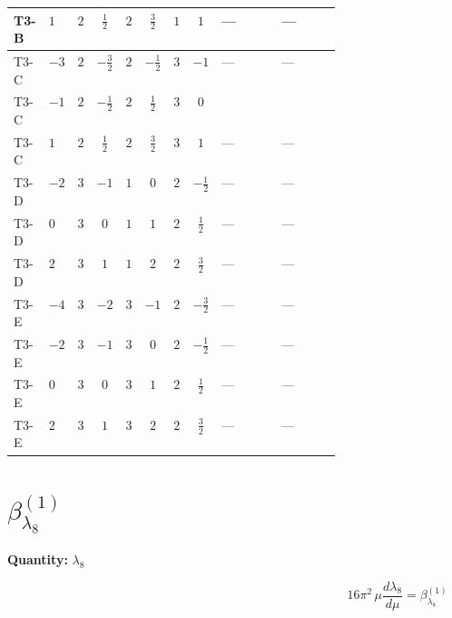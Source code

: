 \documentclass[8pt]{article}
\begin{document}
\begin{landscape}
\begin{longtable}{@{}llcccccc >{\raggedright\arraybackslash}p{0.21\linewidth} >{\raggedright\arraybackslash}p{0.21\linewidth}@{}}
\midrule
T3-B & $1$ & $2$ & $\frac{1}{2}$ & $2$ & $\frac{3}{2}$ & $1$ & $1$ & --- & --- \\
\midrule
T3-C & $-3$ & $2$ & $-\frac{3}{2}$ & $2$ & $-\frac{1}{2}$ & $3$ & $-1$ & --- & --- \\
\midrule
T3-C & $-1$ & $2$ & $-\frac{1}{2}$ & $2$ & $\frac{1}{2}$ & $3$ & $0$ & \scriptsize\adjustbox{max width=\linewidth}{$\begin{gathered} +{\lambda_{HS_2}^{(A)}} \left(-\frac{3 {\lambda_{H H^\dagger S_1^\dagger S_2^\dagger}^{\rm Cross}}}{2}-\frac{3 {\lambda_{10}}}{4}\right)\end{gathered}$} & \scriptsize\adjustbox{max width=\linewidth}{$\begin{gathered} {\lambda_{H H^\dagger S_1^\dagger S_2^\dagger}^{\rm Cross}} \left(\frac{3}{2} T_{\nu}^{(1)}+\frac{3}{2} T_{\nu}^{(2)}+6 \operatorname{Tr}\!\left({Y_d}\,\left({Y_d}\right)^{\dagger}\right)+2 \operatorname{Tr}\!\left({Y_e}\,\left({Y_e}\right)^{\dagger}\right)+6 \operatorname{Tr}\!\left({Y_u}\,\left({Y_u}\right)^{\dagger}\right)\right)\end{gathered}$} \\
\midrule
T3-C & $1$ & $2$ & $\frac{1}{2}$ & $2$ & $\frac{3}{2}$ & $3$ & $1$ & --- & --- \\
\midrule
T3-D & $-2$ & $3$ & $-1$ & $1$ & $0$ & $2$ & $-\frac{1}{2}$ & --- & --- \\
\midrule
T3-D & $0$ & $3$ & $0$ & $1$ & $1$ & $2$ & $\frac{1}{2}$ & --- & --- \\
\midrule
T3-D & $2$ & $3$ & $1$ & $1$ & $2$ & $2$ & $\frac{3}{2}$ & --- & --- \\
\midrule
T3-E & $-4$ & $3$ & $-2$ & $3$ & $-1$ & $2$ & $-\frac{3}{2}$ & --- & --- \\
\midrule
T3-E & $-2$ & $3$ & $-1$ & $3$ & $0$ & $2$ & $-\frac{1}{2}$ & --- & --- \\
\midrule
T3-E & $0$ & $3$ & $0$ & $3$ & $1$ & $2$ & $\frac{1}{2}$ & --- & --- \\
\midrule
T3-E & $2$ & $3$ & $1$ & $3$ & $2$ & $2$ & $\frac{3}{2}$ & --- & --- \\
\midrule
\bottomrule
\end{longtable}
\clearpage
\section*{$\beta_{\lambda_{8}}^{(1)}$}
\noindent\textbf{Quantity: }$\lambda_{8}$\par\smallskip
\[16\pi^2\,\mu\frac{d \lambda_{8}}{d\mu}=\beta_{\lambda_{8}}^{(1)}\]

\end{landscape}
\end{document}
